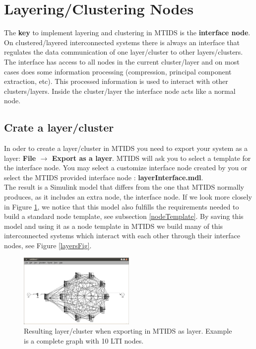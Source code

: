 \documentclass[a4paper,twoside, openright,12pt]{report}
\begin{document}
\section{Layering/Clustering Nodes} \label{layering}


The \textbf{key} to implement layering and clustering in MTIDS is the \textbf{interface node}. On clustered/layered interconnected systems there is always an interface
that regulates the data communication of one layer/cluster to other layers/clusters. The interface has access to all nodes in the current cluster/layer and 
on most cases does some information processing (compression, principal component extraction, etc). This processed information is used to interact with 
other clusters/layers. Inside the cluster/layer the interface node acts like a normal node.
\\

\subsection{Crate a layer/cluster}

In oder to create a layer/cluster in MTIDS you need to export your system as a layer: \textbf{File $\rightarrow$ Export as a layer}.
MTIDS will ask you to select a template for the interface node. You may select a customize interface node created by you or select the MTIDS provided
interface node : \textbf{layerInterface.mdl}.\\
The result is a Simulink model that differs from the one that MTIDS normally produces, as it includes an extra node, the interface node.
If we look more closely in Figure \ref{layerFig}, we notice that this model also fulfills the requirements needed to build a standard node template, see subsection \ref{nodeTemplate}.
By saving this model and using it as a node template in MTIDS we build many of this interconnected systems which interact with each other through their 
interface nodes, see Figure \ref{layersFig}.


\begin{figure}[htb]
\centering
\includegraphics[width=0.5\textwidth]{pics/screenLayer.eps}
\caption[MTIDS export as layer resulting model]{Resulting layer/cluster when exporting in MTIDS as layer. Example is a complete graph with 10 LTI nodes.}
\label{layerFig}
\end{figure}
\end{document}
